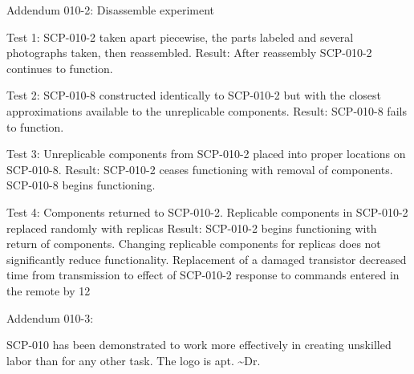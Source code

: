 \documentclass[a4paper, 11pt]{article}
\begin{document}
Addendum 010-2: Disassemble experiment

Test 1: SCP-010-2 taken apart piecewise, the parts labeled and several photographs taken, then reassembled.
Result: After reassembly SCP-010-2 continues to function.

Test 2: SCP-010-8 constructed identically to SCP-010-2 but with the closest approximations available to the unreplicable components.
Result: SCP-010-8 fails to function.

Test 3: Unreplicable components from SCP-010-2 placed into proper locations on SCP-010-8.
Result: SCP-010-2 ceases functioning with removal of components. SCP-010-8 begins functioning.

Test 4: Components returned to SCP-010-2. Replicable components in SCP-010-2 replaced randomly with replicas
Result: SCP-010-2 begins functioning with return of components. Changing replicable components for replicas does not significantly reduce functionality. Replacement of a damaged transistor decreased time from transmission to effect of SCP-010-2 response to commands entered in the remote by 12%

Addendum 010-3:

SCP-010 has been demonstrated to work more effectively in creating unskilled labor than for any other task. The logo is apt. \textasciitilde Dr. 
\end{document}
